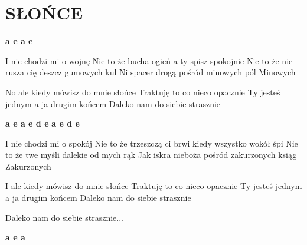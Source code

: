 \documentclass[../../../songbook.tex]{subfiles}
\begin{document}
\TabPositions{8cm} %
\section*{SŁOŃCE}
{}
\vspace{0.5cm}
{\color{red}\textbf{a e a e} } \newline

I nie chodzi mi o wojnę					 		 \newline
Nie to że bucha ogień a ty spisz spokojnie		 \newline 	
Nie to że nie rusza cię deszcz gumowych kul		 \newline 
Ni spacer drogą pośród minowych pól				 \newline 
Minowych										 \newline
						
\-\hspace{1cm} No ale kiedy mówisz do mnie słońce		 \newline
\-\hspace{1cm} Traktuję to co nieco opacznie			 \newline
\-\hspace{1cm} Ty jesteś jednym a ja drugim końcem		 \newline
\-\hspace{1cm} Daleko nam do siebie strasznie			 \newline

{\color{red}\textbf{a e a e d e} } \newline
{\color{red}\textbf{a e d e} } \newline

I nie chodzi mi o spokój  \newline
Nie to że trzeszczą ci brwi kiedy wszystko wokół śpi  \newline
Nie to że twe myśli dalekie od mych rąk  \newline
Jak iskra nieboża pośród zakurzonych ksiąg  \newline
Zakurzonych \newline

\-\hspace{1cm} I ale kiedy mówisz do mnie słońce	 \newline
\-\hspace{1cm} Traktuję to co nieco opacznie	 \newline		
\-\hspace{1cm} Ty jesteś jednym a ja drugim końcem	  \newline
\-\hspace{1cm} Daleko nam do siebie strasznie \newline
	
\-\hspace{1cm} Daleko nam do siebie strasznie...	 \newline	

{\color{red}\textbf{a e a} } \newline
\end{document}
